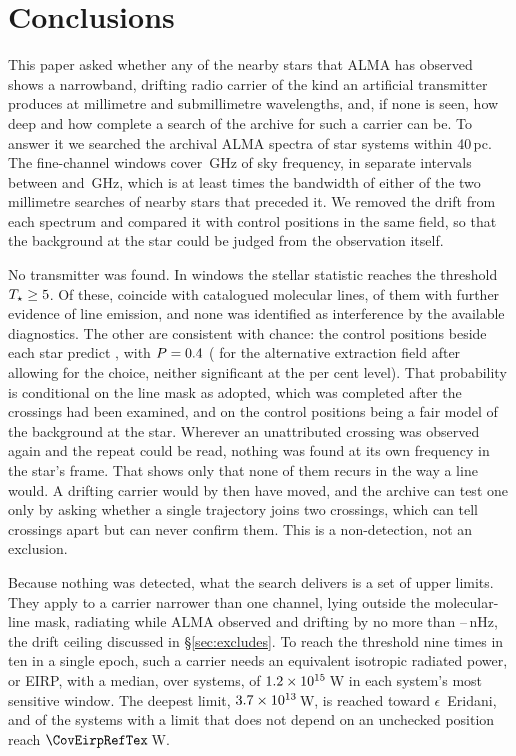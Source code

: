 \section{Conclusions}
\label{sec:conclusions}

This paper asked whether any of the nearby stars that ALMA has observed shows
a narrowband, drifting radio carrier of the kind an artificial transmitter
produces at millimetre and submillimetre wavelengths, and, if none is
seen, how deep and how complete a search of the archive for such a carrier
can be. To answer it we searched the archival ALMA spectra of
\NSysClassA{} star systems within 40\,pc. The fine-channel windows cover
\CvUnionA\,GHz of sky frequency, in \CovNIslands{} separate intervals between
\SurvFreqLoA{} and \SurvFreqHiA\,GHz, which is at least \SbPriorRatio{} times
the bandwidth of either of the two millimetre searches of nearby stars that
preceded it. We removed the drift from
each spectrum and compared it with control positions in the same field, so
that the background at the star could be judged from the observation itself.

No transmitter was found. In \CsNCross{} windows the stellar statistic reaches
the threshold $T_\star\geq5$. Of these, \MkNCoinc{} coincide with
catalogued molecular lines, \LnAttrSupp{} of them with further evidence of
line emission, and none was identified as interference by the available
diagnostics. The other \CeObs{} are consistent with chance: the
control positions beside each star predict \CeExp, with $P=0.4$
(\FrTwoTrialP{} for the alternative extraction field after allowing for the
choice, neither significant at the \CeAlphaPct{} per cent level). That
probability is conditional on the line mask as adopted, which was completed
after the crossings had been examined, and on the control positions being a
fair model of the background at the star. Wherever an unattributed crossing
was observed again and the repeat could be read, nothing was found at its own
frequency in the star's frame. That shows only that none of them recurs
in the way a line would. A drifting carrier would by
then have moved, and the archive can test one only by asking whether a single
trajectory joins two crossings, which can tell crossings apart but can never
confirm them. This is a non-detection, not an exclusion.

Because nothing was detected, what the search delivers is a set of upper
limits. They apply to a carrier narrower than one channel, lying outside the
molecular-line mask, radiating while ALMA observed and drifting by no more
than \DriftCeilLo--\DriftCeilHi\,nHz, the drift ceiling discussed in
\S\ref{sec:excludes}. To reach the threshold nine times in ten in a single
epoch, such a carrier needs an equivalent isotropic radiated power, or
EIRP, with a median, over systems, of
$1.2\times10^{15}$\,W in each system's most sensitive window. The deepest
limit, $3.7\times10^{13}$\,W, is reached toward $\epsilon$~Eridani, and
\NSysEfifteen{} of the \NSysALimSum{} systems with a limit that does not
depend on an unchecked position reach $\CovEirpRefTex$\,W.

